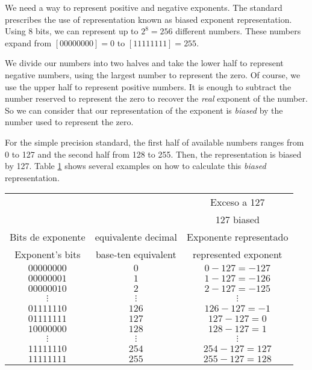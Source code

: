 \begin{paracol}{2}
 We need a way to represent positive and negative exponents. The standard prescribes the use of representation known as biased exponent representation. Using 8 bits, we can represent up to $2^8 = 256$ different numbers. These numbers expand from $[00000000] = 0$ to $[11111111] = 255$. 

We divide our numbers into two halves and take the lower half to represent negative numbers, using the largest number to represent the zero. Of course, we use the upper half to represent positive numbers. It is enough to subtract the number reserved to represent the zero to recover the \emph{real} exponent of the number. So we can consider that our representation of the exponent is \emph{biased} by the number used to represent the zero.

For the simple precision standard, the first half of available numbers ranges from 0 to 127 and the second half from 128 to 255. Then, the representation is biased by 127. Table \ref{tabex} shows several examples on how to calculate this \emph{biased} representation.   
\end{paracol}

\begin{table}
\centering
\begin{tabular}{ccc}
&&Exceso a 127\\
&& 127 biased\\
\hline
Bits de exponente&equivalente decimal&Exponente representado\\
Exponent's bits&base-ten equivalent&represented exponent\\
\hline      
$00000000$&$0$&$0-127=-127$\\
\hline
$00000001$&$1$&$1-127=-126$\\
\hline
$00000010$&$2$&$2-127=-125$\\
\hline
$\vdots$&$\vdots$&$\vdots$\\
\hline
$01111110$&$126$&$126-127=-1$\\
\hline
$01111111$&$127$&$127-127=0$\\
\hline
$10000000$&$128$&$128-127=1$\\
\hline
$\vdots$&$\vdots$&$\vdots$\\
\hline
$11111110$&$254$&$254-127=127$\\
\hline
$11111111$&$255$&$255-127=128$\\
\hline
\end{tabular}
\label{tabex}
\end{table}

